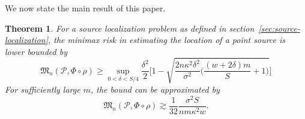 \documentclass[conference]{IEEEtran}
\newcommand{\Phiorho}{\Phi\!\circ\!\rho}
\newtheorem{theorem}{Theorem}
\begin{document}
We now state the main result of this paper.
\begin{theorem} \label{thm:main-lb}
	For a source localization problem as defined in
	section~\ref{sec:source-localization}, the minimax risk in estimating the
	location of a point source is lower bounded by
	\begin{equation}
		\mathfrak{M}_n(\mathcal{P}, \Phi\circ\rho) \geq \sup_{0 < \delta < S/4} \frac{\delta^2}{2} \Bigg[1 - \sqrt{\frac{2n \kappa^2 \delta^2}{\sigma^2}\bigg(\!\frac{(w{+}2\delta) m}{S} + 1\!\bigg)} \Bigg]
	\end{equation}
	For sufficiently large $m$, the bound can be approximated by
	\begin{equation} \label{eq:main-lower-bound}
		\mathfrak{M}_n(\mathcal{P}, \Phiorho) \gtrsim \frac{1}{32} \frac{\sigma^2 S}{nm\kappa^2w}.
	\end{equation}
\end{theorem}%
\end{document}
